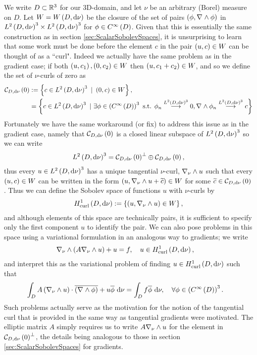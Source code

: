 We write $D\subset\mathbb{R}^3$ for our 3D-domain, and let $\nu$ be an arbitrary (Borel) measure on $D$.
Let $W=W\left( D,\mathrm{d}\nu \right)$ be the closure of the set of pairs $\left( \phi, \nabla_{}\wedge\phi \right)$ in $L^{2}\left( D,\mathrm{d}\nu \right)^3\times L^{2}\left( D,\mathrm{d}\nu \right)^3$ for $\phi\in C^{\infty}\left( D \right)$.
Given that this is essentially the same construction as in section \ref{sec:ScalarSobolevSpaces}, it is unsurprising to learn that some work must be done before the element $c$ in the pair $\left( u,c \right)\in W$ can be thought of as a ``curl".
Indeed we actually have the same problem as in the gradient case; if both $\left( u,c_1 \right), \left( 0, c_2 \right)\in W$ then $\left( u,c_1+c_2 \right)\in W$, and so we define the set of $\nu$-curls of zero as
\begin{align*}
	\curlZero{D}{\nu} &:= \clbracs{ c\in\ltwo{D}{\nu}^3 \ \vert \ \bracs{0,c}\in W }, \\
	&= \clbracs{ c\in\ltwo{D}{\nu}^3 \ \vert \ \exists\phi\in\bracs{\smooth{D}}^3 \text{ s.t. } \phi_n\lconv{\ltwo{D}{\nu}^3}0, \curl{}\phi_n\lconv{\ltwo{D}{\nu}^3}c }
\end{align*}
Fortunately we have the same workaround (or fix) to address this issue as in the gradient case, namely that $\mathcal{C}_{ D, \mathrm{d}\nu}\left( 0 \right)$ is a closed linear subspace of $L^{2}\left( D,\mathrm{d}\nu \right)^3$ so we can write
\begin{align*}
	L^{2}\left( D,\mathrm{d}\nu \right)^3 = \mathcal{C}_{ D, \mathrm{d}\nu}\left( 0 \right)^\perp \oplus \mathcal{C}_{ D, \mathrm{d}\nu}\left( 0 \right),
\end{align*}
thus every $u\in L^{2}\left( D,\mathrm{d}\nu \right)^3$ has a unique tangential $\nu$-curl, $\nabla_{\nu}\wedge u$ such that every $\left( u,c \right)\in W$ can be written in the form $\left( u, \nabla_{\nu}\wedge u + \widetilde{c} \right)\in W$ for some $\widetilde{c}\in\mathcal{C}_{ D, \mathrm{d}\nu}\left( 0 \right)$.
Thus we can define the Sobolev space of functions $u$ with $\nu$-curls by
\begin{align*}
	H^1_\mathrm{curl}\left( D, \mathrm{d}\nu \right) := \left\{  \left( u,\nabla_{\nu}\wedge u \right)\in W  \right\},
\end{align*}
and although elements of this space are technically pairs, it is sufficient to specify only the first component $u$ to identify the pair.
We can also pose problems in this space using a variational formulation in an analogous way to gradients; we write
\begin{align*}
	\nabla_{\nu}\wedge\left( A\nabla_{\nu}\wedge u \right) + u &= f, \quad u\in H^1_\mathrm{curl}\left( D, \mathrm{d}\nu \right),
\end{align*}
and interpret this as the variational problem of finding $u\in H^1_\mathrm{curl}\left( D, \mathrm{d}\nu \right)$ such that
\begin{align*}
	\int_{D} A\left( \nabla_{\nu}\wedge u \right)\cdot\overline{\left( \nabla_{}\wedge\phi \right)} + u\overline{\phi} \ \mathrm{d}\nu &= \int_{D} f\overline{\phi}  \ \mathrm{d}\nu, \quad \forall\phi\in\left( C^{\infty}\left( D \right) \right)^3.
\end{align*}
Such problems actually serve as the motivation for the notion of the tangential curl that is provided in the same way as tangential gradients were motivated.
The elliptic matrix $A$ simply requires us to write $A\nabla_{\nu}\wedge u$ for the element in $\mathcal{C}_{ D, \mathrm{d}\nu}\left( 0 \right)^\perp$, the details being analogous to those in section \ref{sec:ScalarSobolevSpaces} for gradients. \newline

